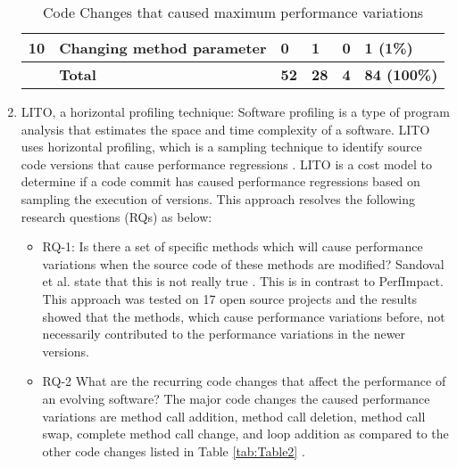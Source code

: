 \documentclass[article,type=msc,colorback,12pt,accentcolor=tud8b,table]{tudthesis}
\begin{document}
\begin{enumerate}
\begin{table}[]
\begin{tabular}{|l|l|l|l|l|l|}
		10 & Changing method parameter                            & 0                                  & 1                                  & 0                                    & 1 (1\%)                                \\ \hline
		& \textbf{Total}                                       & \textbf{52}                        & \textbf{28}                        & \textbf{4}                           & \textbf{84 (100\%)}                    \\ \hline
	\end{tabular}
		\caption{Code Changes that caused maximum performance variations \cite{sandoval2016learning}}
\end{table}

\item{LITO, a horizontal profiling technique:} 
Software profiling is a type of program analysis that estimates the space and time complexity of a software. LITO uses horizontal profiling, which is a sampling technique to identify source code versions that cause performance regressions \cite{sandoval2016learning}. LITO is a cost model to determine if a code commit has caused performance regressions based on sampling the execution of versions. This approach resolves the following research questions (RQs) as below:

\begin{itemize}

\item RQ-1: Is there a set of specific methods which will cause performance variations when the source code of these methods are modified? Sandoval et al. state that this is not really true \cite{sandoval2016learning}. This is in contrast to PerfImpact. This approach was tested on 17 open source projects and the results showed that the methods, which cause performance variations before, not necessarily contributed to the performance variations in the newer versions.

\item RQ-2  What are the recurring code changes that affect the performance of an evolving software? The major code changes the caused performance variations are method call addition, method call deletion, method call swap, complete method call change, and loop addition  as compared to the other code changes listed in Table \ref{tab:Table2} \cite{sandoval2016learning}.

\end{itemize}
\end{enumerate}	
\end{document}
